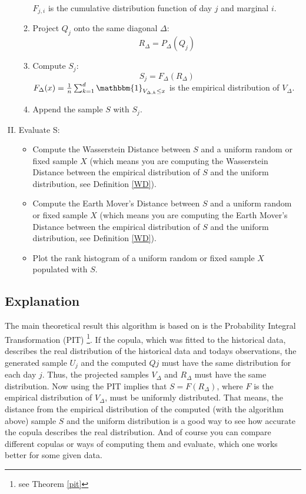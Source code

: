 \begin{enumerate}[I.]
\begin{enumerate}[1.]
\begin{equation*}
		\end{equation*}
		$F_{j,i}$ is the cumulative distribution function of day $j$ and marginal $i$.
		\item Project $Q_{j}$ onto the same diagonal $\Delta$:
		\begin{equation*}
			R_{\Delta}=P_{\Delta}(Q_{j})
		\end{equation*}
		\item Compute $S_{j}$:
		\begin{equation*}
			S_{j}=F_{\Delta}(R_{\Delta})
		\end{equation*}
		$F_{\Delta}(x)=\frac{1}{n}\sum_{k=1}^{d}\mathbbm{1}_{V_{\Delta , k} \leq x}$ is the empirical distribution of $V_{\Delta}$.
		\item Append the sample $S$ with $S_{j}$.
	\end{enumerate}
	\item Evaluate S:
	\begin{itemize}
		\item Compute the Wasserstein Distance between $S$ and a uniform random or fixed sample $X$ (which means you are computing the Wasserstein Distance between the empirical distribution of $S$ and the uniform distribution, see Definition \ref{WD}).
		\item Compute the Earth Mover's Distance between $S$ and a uniform random or fixed sample $X$ (which means you are computing the Earth Mover's Distance between the empirical distribution of $S$ and the uniform distribution, see Definition \ref{WD}).
		\item Plot the rank histogram of a uniform random or fixed sample $X$ populated with $S$.
	\end{itemize}
\end{enumerate}

\subsection{Explanation}

The main theoretical result this algorithm is based on is the Probability Integral Transformation (PIT) \footnote{see Theorem \ref{pit}}. If the copula, which was fitted to the historical data, describes the real distribution of the historical data and todays observations, the generated sample $U_{j}$ and the computed $Q{j}$ must have the same distribution for each day $j$. Thus, the projected samples $V_{\Delta}$ and $R_{\Delta}$ must have the same distribution. Now using the PIT implies that $S=F(R_{\Delta})$, where $F$ is the empirical distribution of $V_{\Delta}$, must be uniformly distributed. That means, the distance from the empirical distribution of the computed (with the algorithm above) sample $S$ and the uniform distribution is a good way to see how accurate the copula describes the real distribution. And of course you can compare different copulas or ways of computing them and evaluate, which one works better for some given data.  
